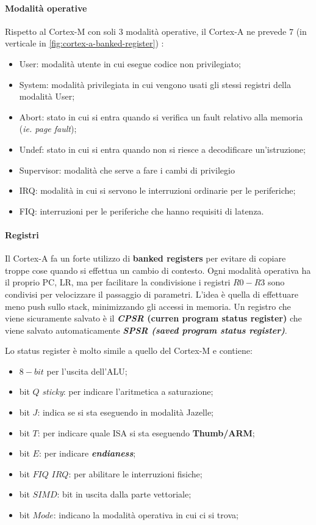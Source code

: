 \documentclass{article}
\begin{document}
\paragraph{Modalità operative} Rispetto al Cortex-M con soli $3$ modalità operative, il Cortex-A ne prevede $7$ (in verticale in \cref{fig:cortex-a-banked-register}) :
\begin{itemize}
  \item User: modalità utente in cui esegue codice non privilegiato;
  \item System: modalità privilegiata in cui vengono usati gli stessi registri della modalità User;
  \item Abort: stato in cui si entra quando si verifica un fault relativo alla memoria (\textit{ie. page fault});
  \item Undef: stato in cui si entra quando non si riesce a decodificare un'istruzione;
  \item Supervisor: modalità che serve a fare i cambi di privilegio 
  \item IRQ: modalità in cui si servono le interruzioni ordinarie per le periferiche;
  \item FIQ: interruzioni per le periferiche che hanno requisiti di latenza.
\end{itemize}

\paragraph{Registri}
Il Cortex-A fa un forte utilizzo di \textbf{banked registers} per evitare di copiare troppe cose quando si effettua un cambio di contesto. Ogni modalità operativa ha il proprio PC, LR, ma per facilitare la condivisione i registri $R0-R3$ sono condivisi per velocizzare il passaggio di parametri.
L'idea è quella di effettuare meno push sullo stack, minimizzando gli accessi in memoria. Un registro che viene sicuramente salvato è il \textbf{\textit{CPSR} (curren program status register)} che viene salvato automaticamente \textbf{\textit{SPSR (saved program status register)}}.

Lo status register è molto simile a quello del Cortex-M e contiene:
\begin{itemize}
  \item $8-bit$ per l'uscita dell'ALU;
  \item bit $Q$ \textit{sticky}: per indicare l'aritmetica a saturazione;
  \item bit $J$: indica se si sta eseguendo in modalità Jazelle;
  \item bit $T$: per indicare quale ISA si sta eseguendo \textbf{Thumb/ARM};
  \item bit $E$: per indicare \textbf{\textit{endianess}};
  \item bit $FIQ$ $IRQ$: per abilitare le interruzioni fisiche;
  \item bit $SIMD$: bit in uscita dalla parte vettoriale;
  \item bit $Mode$: indicano la modalità operativa in cui ci si trova;
\end{itemize}
\end{document}
